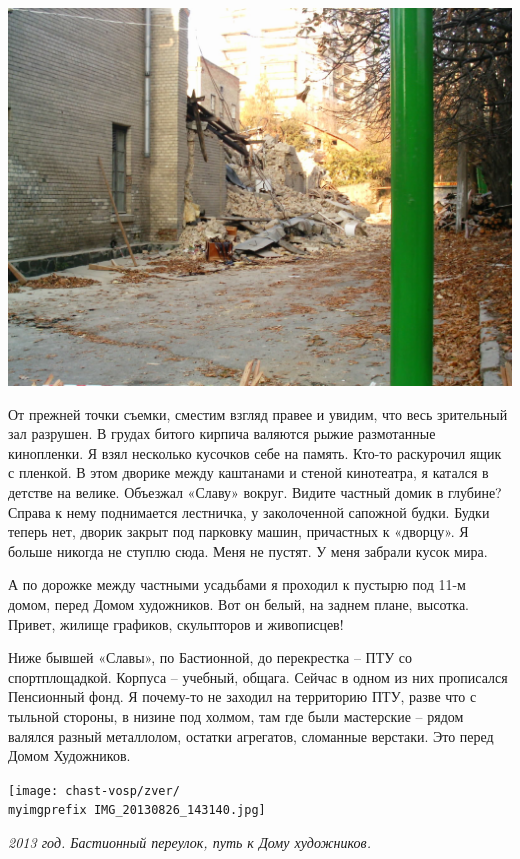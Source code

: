 \begin{center}
\includegraphics[width=\linewidth]{chast-vosp/zver/slava-01.jpg}
\end{center}

От прежней точки съемки, сместим взгляд правее и увидим, что весь зрительный зал разрушен. В грудах битого кирпича валяются рыжие размотанные кинопленки. Я взял несколько кусочков себе на память. Кто-то раскурочил ящик с пленкой. В этом дворике между каштанами и стеной кинотеатра, я катался в детстве на велике. Объезжал «Славу» вокруг. Видите частный домик в глубине? Справа к нему поднимается лестничка, у заколоченной сапожной будки. Будки теперь нет, дворик закрыт под парковку машин, причастных к «дворцу». Я больше никогда не ступлю сюда. Меня не пустят. У меня забрали кусок мира.
 
А по дорожке между частными усадьбами я проходил к пустырю под 11-м домом, перед Домом художников. Вот он белый, на заднем плане, высотка. Привет, жилище графиков, скульпторов и живописцев!

Ниже бывшей «Славы», по Бастионной, до перекрестка – ПТУ со спортплощадкой. Корпуса – учебный, общага. Сейчас в одном из них прописался Пенсионный фонд. Я почему-то не заходил на территорию ПТУ, разве что с тыльной стороны, в низине под холмом, там где были мастерские – рядом валялся разный металлолом, остатки агрегатов, сломанные верстаки. Это перед Домом Художников.

\begin{center}
\texttt{[image: chast-vosp/zver/\\myimgprefix IMG\_20130826\_143140.jpg]}

\textit{2013 год. Бастионный переулок, путь к Дому художников.}
\end{center}


